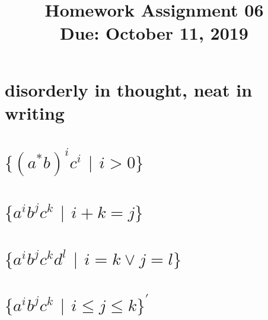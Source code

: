 \documentclass[11pt,letterpaper]{article}
\title{Homework Assignment 06 \\
    \small Due: October 11, 2019}
\begin{document}
\maketitle

\section{disorderly in thought, neat in writing}

\section{$\{(a^*b)^i c^i$ $|$ $i>0\}$}

\section{$\{a^i b^j c^k$ $|$ $i+k=j\}$}

\section{$\{a^i b^j c^k d^l$ $|$ $i=k \vee j=l\}$}

\section{$\{a^i b^j c^k$ $|$ $i \leq j \leq k\}^{'}$}
\end{document}
